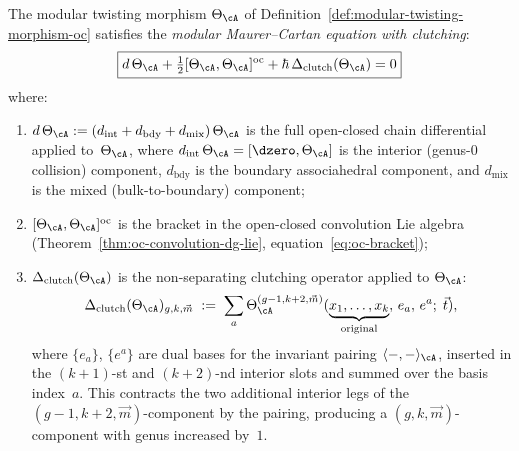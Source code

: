 \begin{theorem}
\label{thm:modular-mc-clutching}
The modular twisting morphism $\Theta_\cA$ of
Definition~\textup{\ref{def:modular-twisting-morphism-oc}}
satisfies the \emph{modular Maurer--Cartan equation with
clutching}:
\begin{equation}\label{eq:modular-mc-clutching}
\boxed{
d\,\Theta_\cA
+ \tfrac{1}{2}[\Theta_\cA, \Theta_\cA]^{\mathrm{oc}}
+ \hbar\,\Delta_{\mathrm{clutch}}(\Theta_\cA)
= 0
}
\end{equation}
where:
\begin{enumerate}[label=\textup{(\roman*)}]
\item $d\,\Theta_\cA := (d_{\mathrm{int}} + d_{\mathrm{bdy}}
 + d_{\mathrm{mix}})\,\Theta_\cA$ is the full open-closed
 chain differential applied to~$\Theta_\cA$, where
 $d_{\mathrm{int}}\,\Theta_\cA = [\dzero, \Theta_\cA]$ is the
 interior (genus-$0$ collision) component,
 $d_{\mathrm{bdy}}$ is the boundary associahedral component, and
 $d_{\mathrm{mix}}$ is the mixed (bulk-to-boundary) component;
\item $[\Theta_\cA, \Theta_\cA]^{\mathrm{oc}}$ is the
 bracket in the open-closed convolution Lie algebra
 \textup{(}Theorem~\textup{\ref{thm:oc-convolution-dg-lie}},
 equation~\eqref{eq:oc-bracket}\textup{)};
\item $\Delta_{\mathrm{clutch}}(\Theta_\cA)$ is the
 non-separating clutching operator applied to $\Theta_\cA$:
 \begin{equation}\label{eq:delta-clutch-def}
 \Delta_{\mathrm{clutch}}(\Theta_\cA)_{g, k, \vec{m}}
 \;:=\;
 \sum_a
 \Theta_\cA^{(g-1, k+2, \vec{m})}
 (\underbrace{x_1, \ldots, x_k}_{\text{original}},\, e_a,\, e^a;\;
 \vec{t}),
 \end{equation}
 where $\{e_a\}$, $\{e^a\}$ are dual bases for the invariant
 pairing $\langle -, - \rangle_\cA$, inserted in the
 $(k{+}1)$-st and $(k{+}2)$-nd interior slots and summed over
 the basis index~$a$.
 This contracts the two additional interior legs of the
 $(g{-}1, k{+}2, \vec{m})$-component by the pairing, producing a
 $(g, k, \vec{m})$-component with genus increased by~$1$.
\end{enumerate}
\end{theorem}

